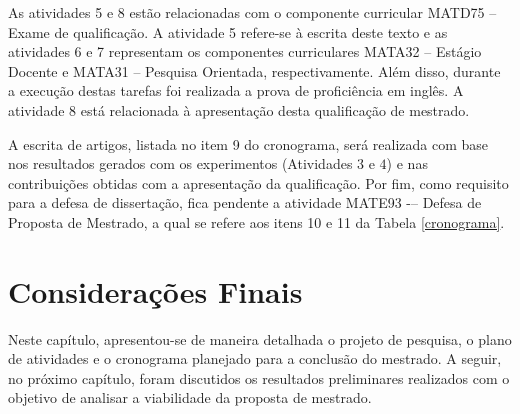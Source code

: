 As atividades 5 e 8 estão relacionadas com o componente curricular MATD75 -- Exame de qualificação. A atividade 5 refere-se à escrita deste texto e as atividades 6 e 7 representam os componentes curriculares MATA32 -- Estágio Docente e MATA31 -- Pesquisa Orientada, respectivamente. Além disso, durante a execução destas tarefas foi realizada a prova de proficiência em inglês. A atividade 8 está relacionada à apresentação desta qualificação de mestrado.
 
A escrita de artigos, listada no item 9 do cronograma, será realizada com base nos resultados gerados com os experimentos (Atividades $3$ e $4$) e nas contribuições obtidas com a apresentação da qualificação. Por fim, como requisito para a defesa de dissertação, fica pendente a atividade MATE93 -– Defesa de Proposta de Mestrado, a qual se refere aos itens 10 e 11 da Tabela \ref{cronograma}. 

\section{Considerações Finais}

Neste capítulo, apresentou-se de maneira detalhada o projeto de pesquisa, o plano de atividades e o cronograma planejado para a conclusão do mestrado. A seguir, no próximo capítulo, foram discutidos os resultados preliminares realizados com o objetivo de analisar a viabilidade da proposta de mestrado.

